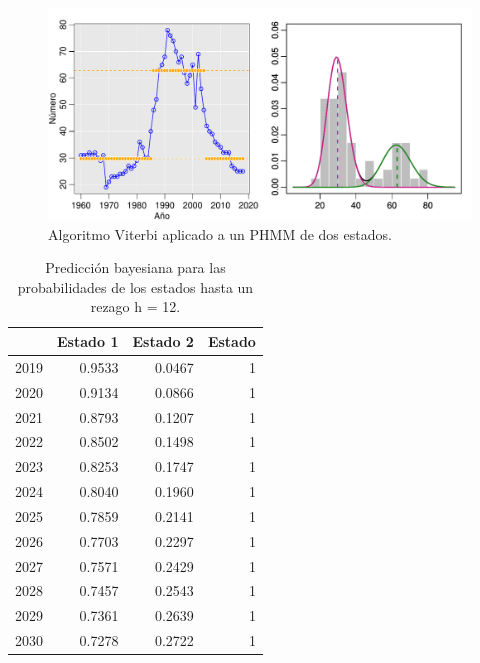 \documentclass[a4paper]{article}\usepackage[]{graphicx}\usepackage[]{color}
\makeatletter
\def\maxwidth{ %
  \ifdim\Gin@nat@width>\linewidth
    \linewidth
  \else
    \Gin@nat@width
  \fi
}
\newenvironment{knitrout}{}{} %
\makeatother
\begin{document}
\begin{knitrout}
\color{fgcolor}\begin{figure}
\includegraphics[width=\maxwidth]{figure/unnamed-chunk-29-1} \caption[Algoritmo Viterbi aplicado a un PHMM de dos estados]{Algoritmo Viterbi aplicado a un PHMM de dos estados.}\label{fig:unnamed-chunk-29}
\end{figure}


\end{knitrout}

\begin{table}[ht]
\centering
\begin{tabular}{rrrr}
  \hline
 & Estado 1 & Estado 2 & Estado \\ 
  \hline
2019 & 0.9533 & 0.0467 &     1 \\ 
  2020 & 0.9134 & 0.0866 &     1 \\ 
  2021 & 0.8793 & 0.1207 &     1 \\ 
  2022 & 0.8502 & 0.1498 &     1 \\ 
  2023 & 0.8253 & 0.1747 &     1 \\ 
  2024 & 0.8040 & 0.1960 &     1 \\ 
  2025 & 0.7859 & 0.2141 &     1 \\ 
  2026 & 0.7703 & 0.2297 &     1 \\ 
  2027 & 0.7571 & 0.2429 &     1 \\ 
  2028 & 0.7457 & 0.2543 &     1 \\ 
  2029 & 0.7361 & 0.2639 &     1 \\ 
  2030 & 0.7278 & 0.2722 &     1 \\ 
   \hline
\end{tabular}
\caption{Predicción bayesiana para las probabilidades de los estados hasta un rezago h = 12.} 
\end{table}
\end{document}
